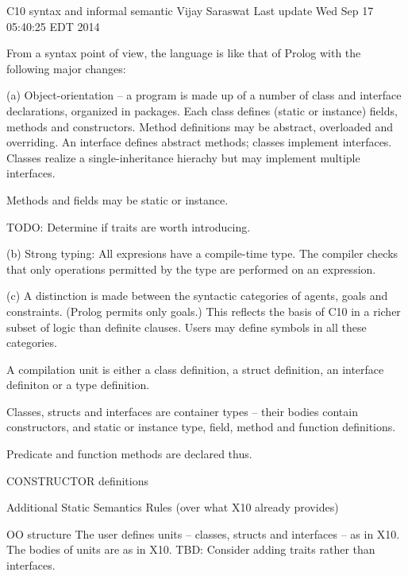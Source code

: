 C10 syntax and informal semantic
Vijay Saraswat
Last update Wed Sep 17 05:40:25 EDT 2014




From a syntax point of view, the language is like that of Prolog with
the following major changes:

  (a) Object-orientation -- a program is made up of a number of class
      and interface declarations, organized in packages. Each class
      defines (static or instance) fields,  methods and
      constructors. Method definitions may be abstract, overloaded and
      overriding. An interface defines abstract methods; classes
      implement interfaces. Classes realize a single-inheritance
      hierachy but may implement multiple interfaces.   

      Methods and fields may be static or instance.

      TODO: Determine if traits are worth introducing.

  (b) Strong typing: All expresions have a compile-time type. The
      compiler checks that only operations permitted by the type are
      performed on an expression. 

  (c) A distinction is made between the syntactic categories of
      agents, goals and constraints. (Prolog permits only goals.) This 
      reflects the basis of C10 in a richer subset of logic than
      definite clauses. Users may define symbols in all these categories. 

A compilation unit is either a class definition, a struct definition,
an interface definiton or a type definition.

Classes, structs and interfaces are container types -- their bodies
contain constructors, and static or instance type, field, method and
function definitions.





Predicate and function methods are declared thus. 










CONSTRUCTOR definitions






Additional Static Semantics Rules
(over what X10 already provides)


OO structure
The user defines units -- classes, structs and interfaces -- as in X10. The bodies 
of units are as in X10. TBD: Consider adding traits rather than interfaces. 



